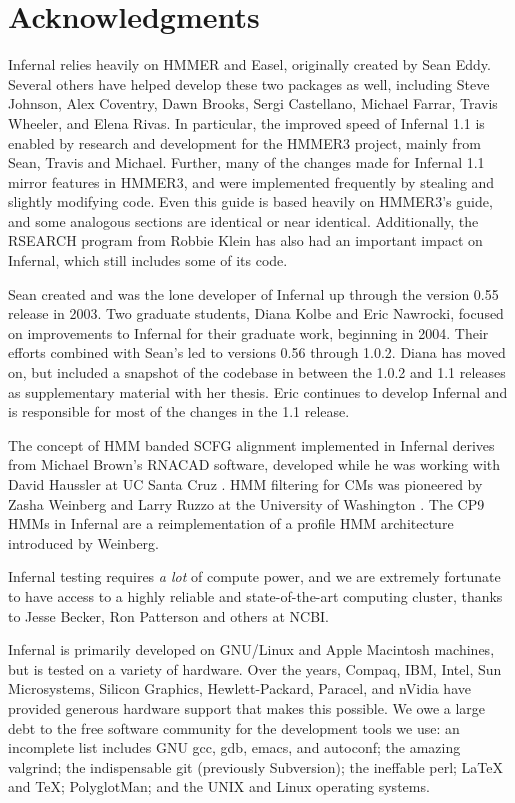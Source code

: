\section{Acknowledgments}

Infernal relies heavily on HMMER and Easel, originally created by Sean
Eddy. Several others have helped develop these two packages as well,
including Steve Johnson, Alex Coventry, Dawn Brooks, Sergi Castellano,
Michael Farrar, Travis Wheeler, and Elena Rivas.  In particular, the
improved speed of Infernal 1.1 is enabled by research and development
for the HMMER3 project, mainly from Sean, Travis and Michael. Further,
many of the changes made for Infernal 1.1 mirror features in HMMER3,
and were implemented frequently by stealing and slightly modifying
code. Even this guide is based heavily on HMMER3's guide, and some
analogous sections are identical or near identical.  Additionally, the
RSEARCH program \citep{KleinEddy03} from Robbie Klein has also had an
important impact on Infernal, which still includes some of its code.

Sean created and was the lone developer of Infernal up through the
version 0.55 release in 2003. Two graduate students, Diana Kolbe and
Eric Nawrocki, focused on improvements to Infernal for their graduate
work, beginning in 2004. Their efforts combined with Sean's led to
versions 0.56 through 1.0.2. Diana has moved on, but
included a snapshot of the codebase in between the 1.0.2 and 1.1
releases as supplementary material with her thesis. Eric continues to
develop Infernal and is responsible for most of the changes in the 1.1
release.

The concept of HMM banded SCFG alignment implemented in Infernal
derives from Michael Brown's RNACAD software, developed while he was
working with David Haussler at UC Santa Cruz \citep{Brown00}. HMM
filtering for CMs was pioneered by Zasha Weinberg and Larry Ruzzo at
the University of Washington
\citep{WeinbergRuzzo04,WeinbergRuzzo04b,WeinbergRuzzo06}. The CP9 HMMs
in Infernal are a reimplementation of a profile HMM architecture
introduced by Weinberg.

Infernal testing requires \emph{a lot} of compute power, and we are
extremely fortunate to have access to a highly reliable and
state-of-the-art computing cluster, thanks to Jesse Becker, Ron
Patterson and others at NCBI.

Infernal is primarily developed on GNU/Linux and Apple Macintosh
machines, but is tested on a variety of hardware. Over the years,
Compaq, IBM, Intel, Sun Microsystems, Silicon Graphics,
Hewlett-Packard, Paracel, and nVidia have provided generous hardware
support that makes this possible. We owe a large debt to the free
software community for the development tools we use: an incomplete
list includes GNU gcc, gdb, emacs, and autoconf; the amazing valgrind;
the indispensable git (previously Subversion); the ineffable perl;
LaTeX and TeX; PolyglotMan; and the UNIX and Linux operating systems.

\label{manualend}
